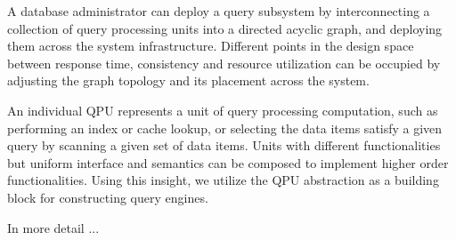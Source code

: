 A database administrator can deploy a query subsystem by interconnecting a collection of query processing units into a directed acyclic graph, and deploying them across the system infrastructure.
Different points in the design space between response time, consistency and resource utilization can be occupied by adjusting the graph topology and its placement across the system.

An individual QPU represents a unit of query processing computation, such as performing an index or cache lookup, or selecting the data items satisfy a given query by scanning a given set of data items.
Units with different functionalities but uniform interface and semantics can be composed to implement higher order functionalities.
Using this insight, we utilize the QPU abstraction as a building block for constructing query engines.




In more detail ...

\label{subsec:qpu}







